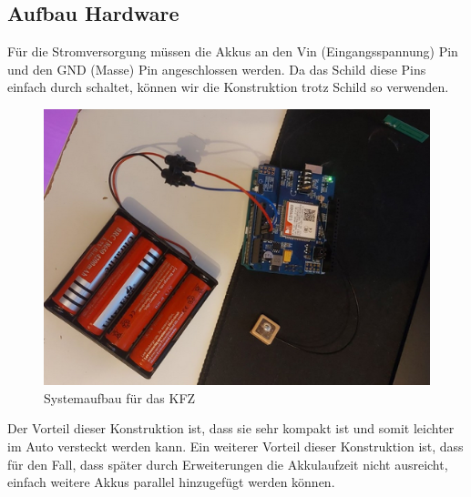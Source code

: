 \subsection{Aufbau Hardware}
Für die Stromversorgung müssen die Akkus an den Vin (Eingangsspannung) Pin und den GND (Masse) Pin angeschlossen werden. Da das Schild diese Pins einfach durch schaltet, können wir die Konstruktion trotz Schild so verwenden.
\begin{figure} [H]
	\begin{center}
		\includegraphics[width=1\textwidth]{Bilder/Arduino_Aufbau.png}
		\caption{Systemaufbau für das KFZ}
		\label{hw-system}
	\end{center}
\end{figure}
Der Vorteil dieser Konstruktion ist, dass sie sehr kompakt ist und somit leichter im Auto versteckt werden kann. Ein weiterer Vorteil dieser Konstruktion ist, dass für den Fall, dass später durch Erweiterungen die Akkulaufzeit nicht ausreicht, einfach weitere Akkus parallel hinzugefügt werden können.

